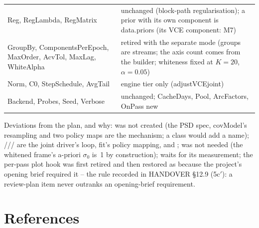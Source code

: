 \begin{longtable}{@{}P{56mm}P{98mm}@{}}
Reg, RegLambda, RegMatrix & unchanged (block-path regularisation); a prior with its own component is data.priors (its VCE component: M7)\\
GroupBy, ComponentsPerEpoch, MaxOrder, AcvTol, MaxLag, WhiteAlpha & retired with the separate mode (groups are streams; the axis count comes from the builder; whiteness fixed at $K=20$, $\alpha=0.05$)\\
Norm, C0, StepSchedule, AvgTail & engine tier only (adjustVCEjoint)\\
Backend, Probes, Seed, Verbose & unchanged; CacheDays, Pool, ArcFactors, OnPass new\\
\bottomrule
\end{longtable}

Deviations from the plan, and why:  was not created (the PSD
spec, covModel's resampling and two policy maps are the mechanism; a class
would add a name); ///
are the joint driver's loop, fit's policy mapping,  and
;  was not needed (the whitened frame's
a-priori $\sigma_0$ is~1 by construction);  waits for its
measurement; the per-pass plot hook was first retired and then restored as
 because the project's opening brief required it -- the rule
recorded in HANDOVER \S12.9 (5c$'$): a review-plan item never outranks an
opening-brief requirement.

\chapter{References}

